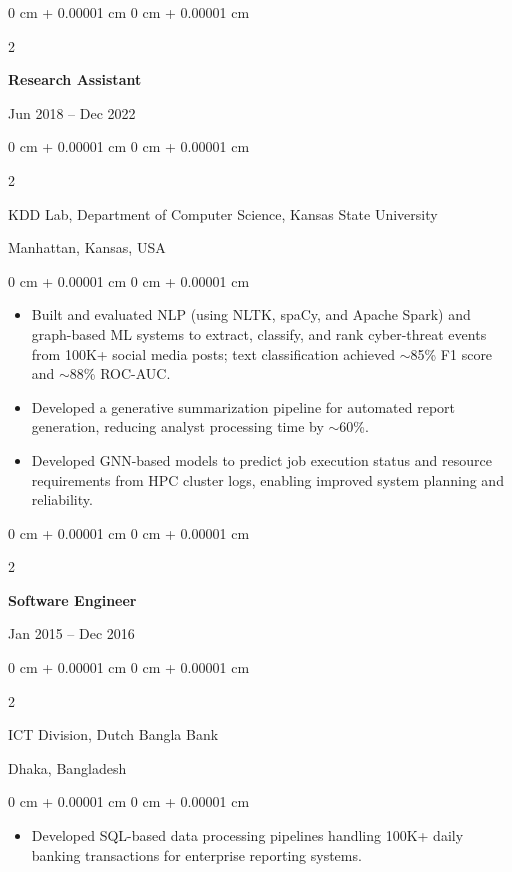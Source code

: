 \documentclass[10pt, letterpaper]{article}
\newenvironment{highlights}{
    \begin{itemize}[
        topsep=0.10 cm,
        parsep=0.10 cm,
        partopsep=0pt,
        itemsep=0pt,
        leftmargin=0 cm + 10pt
    ]
}{
    \end{itemize}
} %
\newenvironment{onecolentry}{
    \begin{adjustwidth}{
        0 cm + 0.00001 cm
    }{
        0 cm + 0.00001 cm
    }
}{
    \end{adjustwidth}
} %
\newenvironment{twocolentry}[2][]{
    \onecolentry
    \def\secondColumn{#2}
    \setcolumnwidth{\fill, 4.5 cm}
    \begin{paracol}{2}
}{
    \switchcolumn \raggedleft \secondColumn
    \end{paracol}
    \endonecolentry
} %
\begin{document}
    \vspace{1mm}

    \begin{twocolentry}{Jun 2018 -- Dec 2022}
        \textbf{Research Assistant}
    \end{twocolentry}
    \begin{twocolentry}{Manhattan, Kansas, USA}
       KDD Lab, Department of Computer Science, Kansas State University
    \end{twocolentry}
    \vspace{0.10 cm}
    \begin{onecolentry}
        \begin{highlights}
            \item Built and evaluated NLP (using NLTK, spaCy, and Apache Spark) and graph-based ML systems to extract, classify, and rank cyber-threat events from 100K+ social media posts; text classification  achieved $\sim$85\% F1 score and $\sim$88\% ROC-AUC.
            \item Developed a generative summarization pipeline for automated report generation, reducing analyst processing time by $\sim$60\%.
            \item Developed GNN-based models to predict job execution status and resource requirements from HPC cluster logs, enabling improved system planning and reliability.
        \end{highlights}
    \end{onecolentry}

    \vspace{0.1 cm}
    \begin{twocolentry}{Jan 2015 -- Dec 2016}
        \textbf{Software Engineer}
    \end{twocolentry}
    \begin{twocolentry}{Dhaka, Bangladesh}
       ICT Division, Dutch Bangla Bank
    \end{twocolentry}

    \begin{onecolentry}
        \begin{highlights}
            \item Developed SQL-based data processing pipelines handling 100K+ daily banking transactions for enterprise reporting systems.
        \end{highlights}
    \end{onecolentry}

\vspace{-1.5mm}
\end{document}
